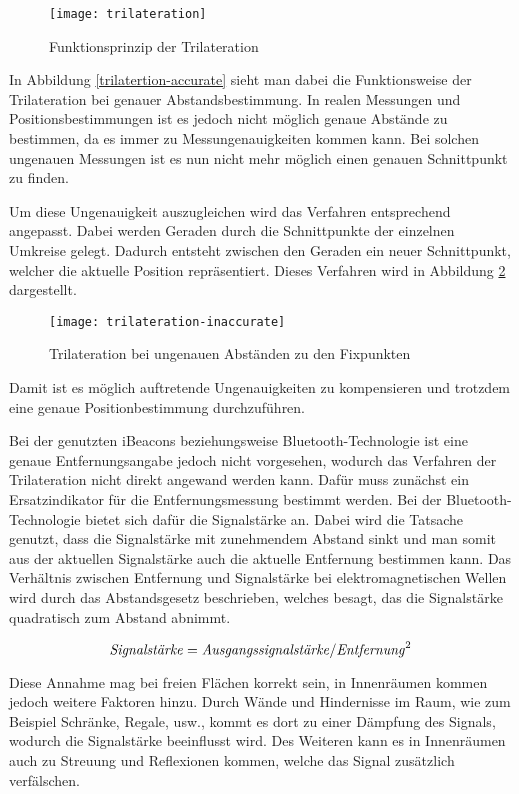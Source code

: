 \begin{figure}[htb!]
	\centering
	\texttt{[image: trilateration]}
	\caption{Funktionsprinzip der Trilateration}
	\label{trilateration-accurate}
\end{figure}

In Abbildung \ref{trilatertion-accurate} sieht man dabei die Funktionsweise der Trilateration bei genauer Abstandsbestimmung. In realen Messungen und Positionsbestimmungen ist es jedoch nicht möglich genaue Abstände zu bestimmen, da es immer zu Messungenauigkeiten kommen kann.
Bei solchen ungenauen Messungen ist es nun nicht mehr möglich einen genauen Schnittpunkt zu finden. 

Um diese Ungenauigkeit auszugleichen wird das Verfahren entsprechend angepasst. Dabei werden Geraden durch die Schnittpunkte der einzelnen Umkreise gelegt. Dadurch entsteht zwischen den Geraden ein neuer Schnittpunkt, welcher die aktuelle Position repräsentiert. Dieses Verfahren wird in Abbildung \ref{trilateration-inaccurate} dargestellt.

\begin{figure}[htb!]
		\centering
	\texttt{[image: trilateration-inaccurate]}
	\caption{Trilateration bei ungenauen Abständen zu den Fixpunkten}
	\label{trilateration-inaccurate}
\end{figure}

Damit ist es möglich auftretende Ungenauigkeiten zu kompensieren und trotzdem eine genaue Positionbestimmung durchzuführen.

Bei der genutzten iBeacons beziehungsweise Bluetooth-Technologie ist eine genaue Entfernungsangabe jedoch nicht vorgesehen, wodurch das Verfahren der Trilateration nicht direkt angewand werden kann. Dafür muss zunächst ein Ersatzindikator für die Entfernungsmessung bestimmt werden.
Bei der Bluetooth-Technologie bietet sich dafür die Signalstärke an.
Dabei wird die Tatsache genutzt, dass die Signalstärke mit zunehmendem Abstand sinkt und man somit aus der aktuellen Signalstärke auch die aktuelle Entfernung bestimmen kann. 
Das Verhältnis zwischen Entfernung und Signalstärke bei elektromagnetischen Wellen wird durch das Abstandsgesetz beschrieben, welches besagt, das die Signalstärke quadratisch zum Abstand abnimmt.

\begin{equation}
	\text{\emph{Signalstärke}} = \text{\emph{Ausgangssignalstärke}}/\text{\emph{Entfernung}}^2
\end{equation}

Diese Annahme mag bei freien Flächen korrekt sein, in Innenräumen kommen jedoch weitere Faktoren hinzu. 
Durch Wände und Hindernisse im Raum, wie zum Beispiel Schränke, Regale, usw., kommt es dort zu einer Dämpfung des Signals, wodurch die Signalstärke beeinflusst wird. Des Weiteren kann es in Innenräumen auch zu Streuung und Reflexionen kommen, welche das Signal zusätzlich verfälschen.

